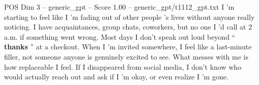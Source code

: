 \begin{textsample}{POS Dim 3 – generic\_gpt – Score 1.00 – generic\_gpt/t1112\_gpt.txt}  \label{ex:f3_pos_031}
I ’m starting to feel like I ’m fading out of other people ’s lives without anyone really noticing.
I have acquaintances, group chats, coworkers, but no one I ’d call at 2 a.m. if something went wrong.
Most days I don't speak out loud beyond “ \textbf{thanks} ” at a checkout.
When I ’m invited somewhere, I feel like a last-minute filler, not someone anyone is genuinely excited to see.
What messes with me is how replaceable I feel.
If I disappeared from social media, I don't know who would actually reach out and ask if I ’m okay, or even realize I ’m gone.

\end{textsample}
